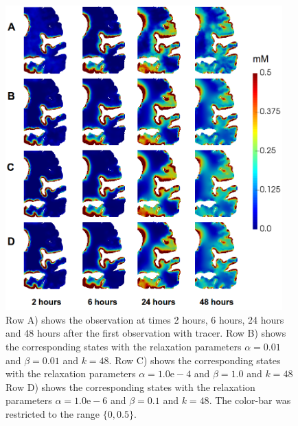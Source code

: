 \documentclass[11pt,a4paper]{article}
\begin{document}
\begin{figure}
\centering
\includegraphics[width=0.95\textwidth]{different.png} 
\caption{Row A) shows the observation at times 2 hours, 6 hours, 24 hours and 48 hours after the first observation with tracer. Row B) shows the corresponding states with the relaxation parameters $\alpha=0.01$ and $\beta=0.01$ and $k=48$.   Row C) shows the corresponding states with the relaxation parameters $\alpha=1.0\mathrm{e-4}$ and $\beta=1.0$ and $k=48$
 Row D) shows the corresponding states with the relaxation parameters $\alpha=1.0\mathrm{e-6}$ and $\beta=0.1$ and $k=48$. The color-bar was restricted to the range $ \lbrace 0 ,0.5 \rbrace$. }
\label{Fig::realdata}
\end{figure}
\end{document}

